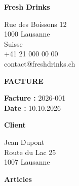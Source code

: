 \documentclass[11pt,a4paper]{article}
\begin{document}

\begin{minipage}[t]{0.55\textwidth}

    {\Huge\bfseries\color{green} Fresh Drinks}

    \vspace{0.3cm}

    Rue des Boissons 12\\
    1000 Lausanne\\
    Suisse\\
    +41 21 000 00 00\\
    contact@freshdrinks.ch

\end{minipage}%
\begin{minipage}[t]{0.45\textwidth}

    \raggedleft

    {\Huge\bfseries FACTURE}

    \vspace{0.4cm}

    \textbf{Facture :} 2026-001\\
    \textbf{Date :} 10.10.2026

\end{minipage}


\vspace{1cm}



{\large\bfseries Client}

\vspace{0.2cm}

Jean Dupont\\
Route du Lac 25\\
1007 Lausanne

\vspace{1cm}



{\large\bfseries Articles}

\vspace{0.3cm}


%
\end{document}
